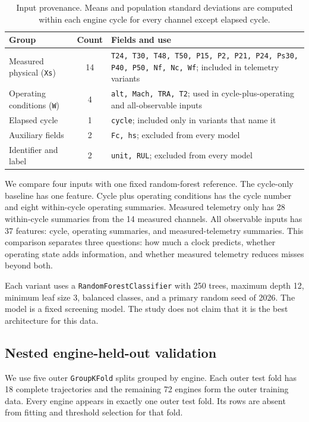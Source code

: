 \begin{table}[H]
\centering
\caption{Input provenance. Means and population standard deviations are
computed within each engine cycle for every channel except elapsed cycle.}
\label{tab:feature-provenance}
\small
\begin{tabular}{p{}c p{}}
\toprule
Group & Count & Fields and use \\
\midrule
Measured physical (\texttt{Xs}) & 14 & \texttt{T24, T30, T48, T50, P15, P2, P21, P24, Ps30, P40, P50, Nf, Nc, Wf}; included in telemetry variants \\
Operating conditions (\texttt{W}) & 4 & \texttt{alt, Mach, TRA, T2}; used in cycle-plus-operating and all-observable inputs \\
Elapsed cycle & 1 & \texttt{cycle}; included only in variants that name it \\
Auxiliary fields & 2 & \texttt{Fc, hs}; excluded from every model \\
Identifier and label & 2 & \texttt{unit, RUL}; excluded from every model \\
\bottomrule
\end{tabular}
\end{table}

We compare four inputs with one fixed random-forest reference. The cycle-only
baseline has one feature. Cycle plus operating conditions has the cycle number
and eight within-cycle operating summaries. Measured telemetry only has 28
within-cycle summaries from the 14 measured channels. All observable inputs has
37 features: cycle, operating summaries, and measured-telemetry summaries. This
comparison separates three questions: how much a clock predicts, whether
operating state adds information, and whether measured telemetry reduces misses
beyond both.

Each variant uses a \texttt{RandomForestClassifier} with 250 trees, maximum
depth 12, minimum leaf size 3, balanced classes, and a primary random seed of
2026. The model is a fixed screening model. The study does not claim that it is
the best architecture for this data.

\subsection{Nested engine-held-out validation}

We use five outer \texttt{GroupKFold} splits grouped by engine. Each outer
test fold has 18 complete trajectories and the remaining 72 engines form the
outer training data. Every engine appears in exactly one outer test fold. Its
rows are absent from fitting and threshold selection for that fold.

